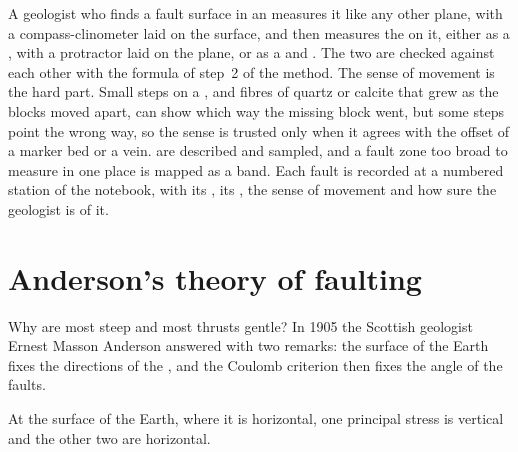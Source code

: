\begin{inthefield}
A geologist who finds a fault surface in an  measures it like any other
plane, with a compass-clinometer laid on the surface, and then measures the
 on it, either as a , with a protractor laid on the plane, or
as a  and . The two are checked against each other with the
formula of step~2 of the method. The sense of movement is the hard part. Small
steps on a , and fibres of quartz or calcite that grew as the
blocks moved apart, can show which way the missing block went, but some steps
point the wrong way, so the sense is trusted only when it agrees with the
offset of a marker bed or a vein.  are described and sampled, and a
fault zone too broad to measure in one place is mapped as a band. Each fault is
recorded at a numbered station of the notebook, with its , its
, the sense of movement and how sure the geologist is of it.
\end{inthefield}

\section{Anderson's theory of faulting}\label{sec:b1:faults-folds-fabrics:anderson}

Why are most  steep and most thrusts gentle? In 1905 the Scottish
geologist Ernest Masson Anderson answered with two remarks: the surface of the
Earth fixes the directions of the , and the Coulomb
criterion then fixes the angle of the faults.

\begin{proposition}\label{prop:b1:faults-folds-fabrics:free-surface}
At the surface of the Earth, where it is horizontal, one principal stress is
vertical and the other two are horizontal.
\end{proposition}

